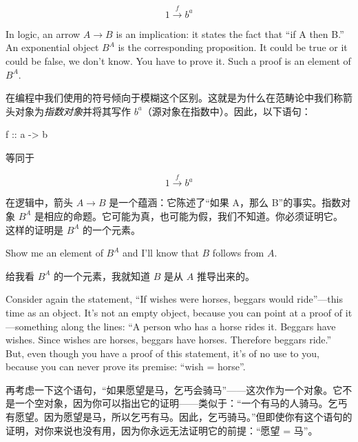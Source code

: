 \documentclass[DaoFP]{subfiles}
\begin{document}
 \[ 1 \xrightarrow f b^a\]

 In logic, an arrow $ A \to B$ is an implication: it states the fact that ``if A then B.'' An exponential object $ B^A$ is the corresponding proposition. It could be true or it could be false, we don't know. You have to prove it. Such a proof is an element of $ B^A$.

 在编程中我们使用的符号倾向于模糊这个区别。这就是为什么在范畴论中我们称箭头对象为\emph{指数对象}并将其写作 $ b^a$（源对象在指数中）。因此，以下语句：
 \begin{haskell}
  f :: a -> b
 \end{haskell}
 等同于

 \[ 1 \xrightarrow f b^a\]

 在逻辑中，箭头 $ A \to B$ 是一个蕴涵：它陈述了``如果 A，那么 B''的事实。指数对象 $ B^A$ 是相应的命题。它可能为真，也可能为假，我们不知道。你必须证明它。这样的证明是 $ B^A$ 的一个元素。

 Show me an element of $ B^A$ and I'll know that $ B$ follows from $ A$.

 给我看 $ B^A$ 的一个元素，我就知道 $ B$ 是从 $ A$ 推导出来的。

 Consider again the statement, ``If wishes were horses, beggars would ride''---this time as an object. It's not an empty object, because you can point at a proof of it---something along the lines: ``A person who has a horse rides it. Beggars have wishes. Since wishes are horses, beggars have horses. Therefore beggars ride.'' But, even though you have a proof of this statement, it's of no use to you, because you can never prove its premise: ``wish = horse''.

 再考虑一下这个语句，“如果愿望是马，乞丐会骑马”——这次作为一个对象。它不是一个空对象，因为你可以指出它的证明——类似于：“一个有马的人骑马。乞丐有愿望。因为愿望是马，所以乞丐有马。因此，乞丐骑马。”但即使你有这个语句的证明，对你来说也没有用，因为你永远无法证明它的前提：“愿望 = 马”。
\end{document}
